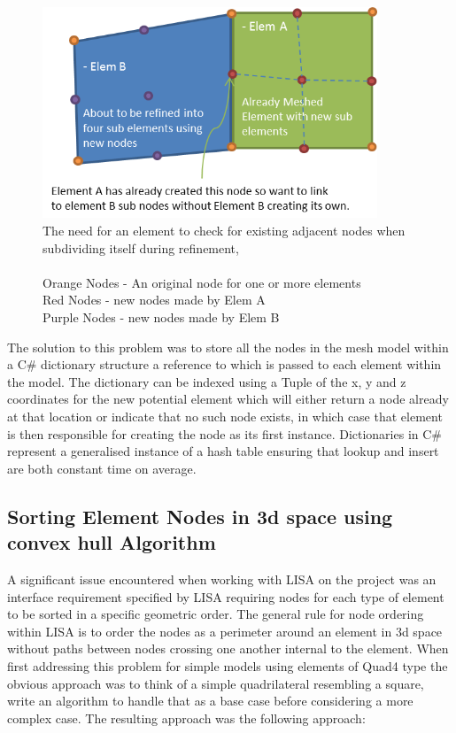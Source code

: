 \begin{figure}[!h]
  \centerline{\includegraphics[width=100mm , scale=1]{../Graphics/nodeLinking.png}}
  \caption{The need for an element to check for existing adjacent nodes when subdividing itself during refinement,\\ \\
  	Orange Nodes - An original node for one or more elements \\
	Red Nodes - new nodes made by Elem A \\
	Purple Nodes - new nodes made by Elem B \\
  }
  \label{fig:h-refinementImp}
\end{figure}


\noindent
The solution to this problem was to store all the nodes in the mesh model within a C\# dictionary structure a reference to which is passed to each element within the model. The dictionary can be indexed using a Tuple of the x, y and z coordinates for the new potential element which will either return a node already at that location or indicate that no such node exists, in which case that element is then responsible for creating the node as its first instance. Dictionaries in C\# represent a generalised instance of a hash table ensuring that lookup and insert are both constant time on average.


\subsection{Sorting Element Nodes in 3d space using convex hull Algorithm}
A significant issue encountered when working with LISA on the project was an interface requirement specified by LISA requiring nodes for each type of element to be sorted in a specific geometric order. The general rule for node ordering within LISA is to order the nodes as a perimeter around an element in 3d space without paths between nodes crossing one another internal to the element. When first addressing this problem for simple models using elements of Quad4 type the obvious approach was to think of a simple quadrilateral resembling a square, write an algorithm to handle that as a base case before considering a more complex case. The resulting approach was the following approach:

